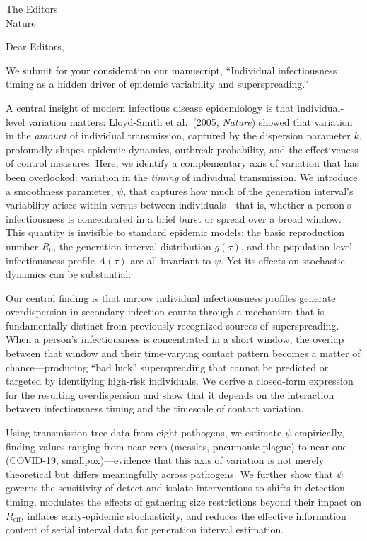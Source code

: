 \documentclass[11pt]{letter}
\begin{document}
\begin{letter}{The Editors\\Nature}

\opening{Dear Editors,}

We submit for your consideration our manuscript, ``Individual infectiousness timing as a hidden driver of epidemic variability and superspreading.''

A central insight of modern infectious disease epidemiology is that individual-level variation matters: Lloyd-Smith et al.\ (2005, \textit{Nature}) showed that variation in the \textit{amount} of individual transmission, captured by the dispersion parameter $k$, profoundly shapes epidemic dynamics, outbreak probability, and the effectiveness of control measures. Here, we identify a complementary axis of variation that has been overlooked: variation in the \textit{timing} of individual transmission. We introduce a smoothness parameter, $\psi$, that captures how much of the generation interval's variability arises within versus between individuals---that is, whether a person's infectiousness is concentrated in a brief burst or spread over a broad window. This quantity is invisible to standard epidemic models: the basic reproduction number $R_0$, the generation interval distribution $g(\tau)$, and the population-level infectiousness profile $A(\tau)$ are all invariant to $\psi$. Yet its effects on stochastic dynamics can be substantial.

Our central finding is that narrow individual infectiousness profiles generate overdispersion in secondary infection counts through a mechanism that is fundamentally distinct from previously recognized sources of superspreading. When a person's infectiousness is concentrated in a short window, the overlap between that window and their time-varying contact pattern becomes a matter of chance---producing ``bad luck'' superspreading that cannot be predicted or targeted by identifying high-risk individuals. We derive a closed-form expression for the resulting overdispersion and show that it depends on the interaction between infectiousness timing and the timescale of contact variation.

Using transmission-tree data from eight pathogens, we estimate $\psi$ empirically, finding values ranging from near zero (measles, pneumonic plague) to near one (COVID-19, smallpox)---evidence that this axis of variation is not merely theoretical but differs meaningfully across pathogens. We further show that $\psi$ governs the sensitivity of detect-and-isolate interventions to shifts in detection timing, modulates the effects of gathering size restrictions beyond their impact on $R_\text{eff}$, inflates early-epidemic stochasticity, and reduces the effective information content of serial interval data for generation interval estimation.


\end{letter}
\end{document}
